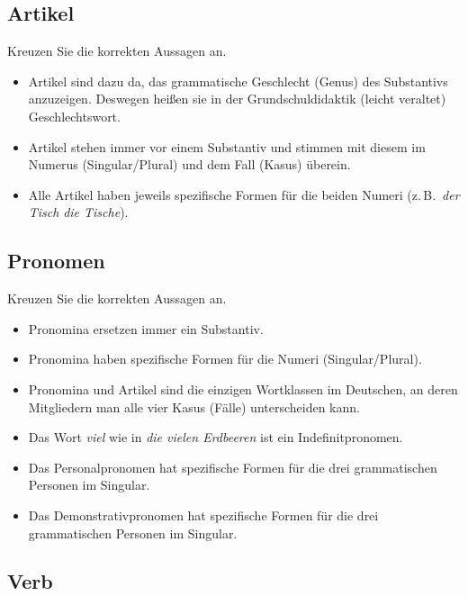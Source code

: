 \documentclass[12pt,a4paper,twoside]{article}
\begin{document}
\subsection{\morphologieaufgabe Artikel}

Kreuzen Sie die korrekten Aussagen an.

\begin{itemize}[label=\Square]\Lf
  \item Artikel sind dazu da, das grammatische Geschlecht (Genus) des Substantivs anzuzeigen.
    Deswegen heißen sie in der Grundschuldidaktik (leicht veraltet) Geschlechtswort.
  \item[\Solcross] Artikel stehen immer vor einem Substantiv und stimmen mit diesem im Numerus (Singular\slash Plural) und dem Fall (Kasus) überein.
  \item[\Solcross] Alle Artikel haben jeweils spezifische Formen für die beiden Numeri (z.\,B.\ \textit{der Tisch}  \textit{die Tische}).
\end{itemize}


\newpage

\subsection{\morphologieaufgabe Pronomen}

Kreuzen Sie die korrekten Aussagen an.

\begin{itemize}[label=\Square]\Lf
  \item Pronomina ersetzen immer ein Substantiv.
  \item[\Solcross] Pronomina haben spezifische Formen für die Numeri (Singular\slash Plural).
  \item[\Solcross] Pronomina und Artikel sind die einzigen Wortklassen im Deutschen, an deren Mitgliedern man alle vier Kasus (Fälle) unterscheiden kann.
  \item Das Wort \textit{viel} wie in \textit{die vielen Erdbeeren} ist ein Indefinitpronomen.
  \item[\Solcross] Das Personalpronomen hat spezifische Formen für die drei grammatischen Personen im Singular.
  \item[\Solcross] Das Demonstrativpronomen hat spezifische Formen für die drei grammatischen Personen im Singular.
\end{itemize}


\subsection{\morphologieaufgabe Verb}
\end{document}

